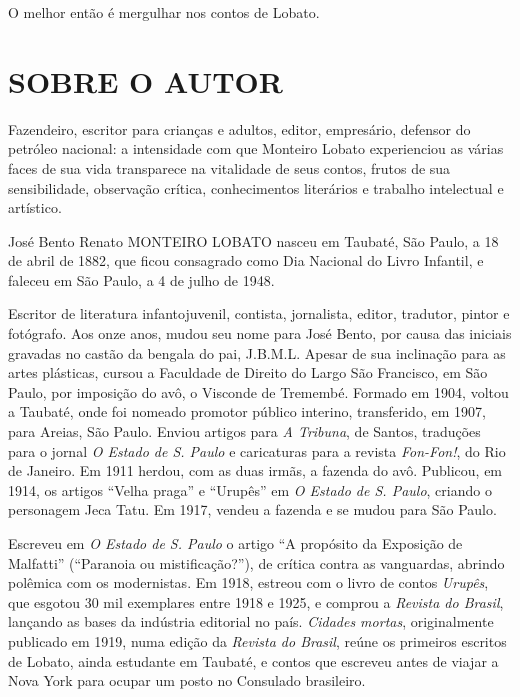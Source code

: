 O melhor então é mergulhar nos contos de Lobato.

\section{SOBRE O AUTOR}

Fazendeiro, escritor para crianças e adultos, editor, empresário,
defensor do petróleo nacional: a intensidade com que Monteiro Lobato
experienciou as várias faces de sua vida transparece na vitalidade de
seus contos, frutos de sua sensibilidade, observação crítica,
conhecimentos literários e trabalho intelectual e artístico.

José Bento Renato MONTEIRO LOBATO nasceu em Taubaté, São Paulo, a 18 de
abril de 1882, que ficou consagrado como Dia Nacional do Livro Infantil,
e faleceu em São Paulo, a 4 de julho de 1948.

Escritor de literatura infantojuvenil, contista, jornalista, editor,
tradutor, pintor e fotógrafo. Aos onze anos, mudou seu nome para José
Bento, por causa das iniciais gravadas no castão da bengala do pai,
J.B.M.L. Apesar de sua inclinação para as artes plásticas, cursou a
Faculdade de Direito do Largo São Francisco, em São Paulo, por imposição
do avô, o Visconde de Tremembé. Formado em 1904, voltou a Taubaté, onde
foi nomeado promotor público interino, transferido, em 1907, para
Areias, São Paulo. Enviou artigos para \emph{A Tribuna}, de Santos,
traduções para o jornal \emph{O Estado de S. Paulo} e caricaturas para a
revista \emph{Fon-Fon!}, do Rio de Janeiro. Em 1911 herdou, com as duas
irmãs, a fazenda do avô. Publicou, em 1914, os artigos ``Velha praga'' e
``Urupês'' em \emph{O Estado de S. Paulo}, criando o personagem Jeca
Tatu. Em 1917, vendeu a fazenda e se mudou para São Paulo.

Escreveu em \emph{O Estado de S. Paulo} o artigo ``A propósito da
Exposição de Malfatti'' (``Paranoia ou mistificação?''), de crítica
contra as vanguardas, abrindo polêmica com os modernistas. Em 1918,
estreou com o livro de contos \emph{Urupês}, que esgotou 30 mil
exemplares entre 1918 e 1925, e comprou a \emph{Revista do Brasil},
lançando as bases da indústria editorial no país. \emph{Cidades mortas},
originalmente publicado em 1919, numa edição da \emph{Revista do
Brasil}, reúne os primeiros escritos de Lobato, ainda estudante em
Taubaté, e contos que escreveu antes de viajar a Nova York para ocupar
um posto no Consulado brasileiro.

